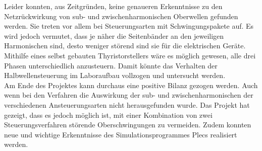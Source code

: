 Leider konnten, aus Zeitgründen, keine genaueren Erkenntnisse zu den Netzrückwirkung von sub- und zwischenharmonischen Oberwellen gefunden werden. Sie treten vor allem bei Steuerungsarten mit Schwingungspakete auf. Es wird jedoch vermutet, dass je näher die Seitenbänder an den jeweiligen Harmonischen sind, desto weniger störend sind sie für die elektrischen Geräte.\\
Mithilfe eines selbst gebauten Thyristorstellers wäre es möglich gewesen, alle drei Phasen unterschiedlich anzusteuern. Damit könnte das Verhalten der Halbwellensteuerung im Laboraufbau vollzogen und untersucht werden.\\
Am Ende des Projektes kann durchaus eine positive Bilanz gezogen werden. Auch wenn bei den Verfahren die Auswirkung der sub- und zwischenharmonischen der verschiedenen Ansteuerungsarten nicht herausgefunden wurde. Das Projekt hat gezeigt, dass es jedoch möglich ist, mit einer Kombination von zwei Steuerungsverfahren störende Oberschwingungen zu vermeiden. Zudem konnten neue und wichtige Erkenntnisse des Simulationsprogrammes Plecs realisiert werden.  





